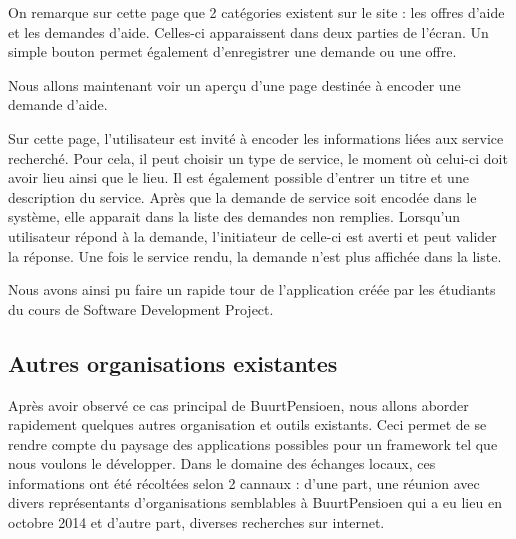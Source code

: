 On remarque sur cette page que 2 catégories existent sur le site : les offres d'aide et les demandes d'aide.  Celles-ci apparaissent dans deux parties de l'écran.  Un simple bouton permet également d'enregistrer une demande ou une offre.  

Nous allons maintenant voir un aperçu d'une page destinée à encoder une demande d'aide.

\vspace{1cm}
\vspace{1cm}

Sur cette page,  l'utilisateur est invité à encoder les informations liées aux service recherché.  Pour cela,  il peut choisir un type de service,  le moment où celui-ci doit avoir lieu ainsi que le lieu.  Il est également possible d'entrer un titre et une description du service.  Après que la demande de service soit encodée dans le système,  elle apparait dans la liste des demandes non remplies.  Lorsqu'un utilisateur répond à la demande,  l'initiateur de celle-ci est averti et peut valider la réponse.  Une fois le service rendu,  la demande n'est plus affichée dans la liste.

Nous avons ainsi pu faire un rapide tour de l'application créée par les étudiants du cours de Software Development Project.

\subsection{Autres organisations existantes}
\label{autresOrgas}
Après avoir observé ce cas principal de BuurtPensioen,  nous allons aborder rapidement quelques autres organisation et outils existants.  Ceci permet de se rendre compte du paysage des applications possibles pour un framework tel que nous voulons le développer.  Dans le domaine des échanges locaux,  ces informations ont été récoltées selon 2 cannaux : d'une part,  une réunion avec divers représentants d'organisations semblables à BuurtPensioen qui a eu lieu en octobre 2014 et d'autre part,  diverses recherches sur internet.


